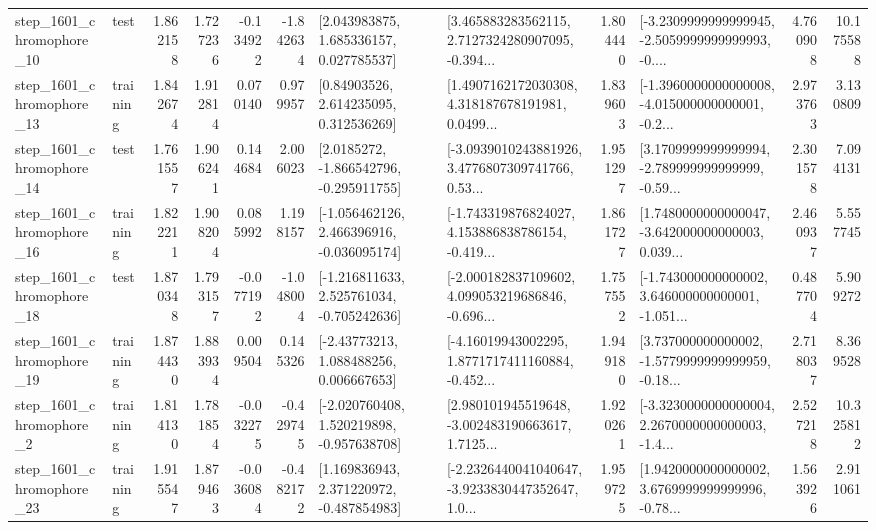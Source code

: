 \begin{tabular}{llrrrrllrlrr}
 step\_1601\_chromophore\_10 &      test &      1.862158 &    1.727236 &     -0.134922 & -1.842634 &     [2.043983875, 1.685336157, 0.027785537] &  [3.465883283562115, 2.7127324280907095, -0.394... &       1.804440 &  [-3.2309999999999945, -2.5059999999999993, -0.... &            4.760908 &         10.175588 \\
 step\_1601\_chromophore\_13 &  training &      1.842674 &    1.912814 &      0.070140 &  0.979957 &      [0.84903526, 2.614235095, 0.312536269] &  [1.4907162172030308, 4.318187678191981, 0.0499... &       1.839603 &  [-1.3960000000000008, -4.015000000000001, -0.2... &            2.973763 &          3.130809 \\
 step\_1601\_chromophore\_14 &      test &      1.761557 &    1.906241 &      0.144684 &  2.006023 &     [2.0185272, -1.866542796, -0.295911755] &  [-3.0939010243881926, 3.4776807309741766, 0.53... &       1.951297 &  [3.1709999999999994, -2.789999999999999, -0.59... &            2.301578 &          7.094131 \\
 step\_1601\_chromophore\_16 &  training &      1.822211 &    1.908204 &      0.085992 &  1.198157 &   [-1.056462126, 2.466396916, -0.036095174] &  [-1.743319876824027, 4.153886838786154, -0.419... &       1.861727 &  [1.7480000000000047, -3.642000000000003, 0.039... &            2.460937 &          5.557745 \\
 step\_1601\_chromophore\_18 &      test &      1.870348 &    1.793157 &     -0.077192 & -1.048004 &   [-1.216811633, 2.525761034, -0.705242636] &  [-2.000182837109602, 4.099053219686846, -0.696... &       1.757552 &  [-1.743000000000002, 3.646000000000001, -1.051... &            0.487704 &          5.909272 \\
 step\_1601\_chromophore\_19 &  training &      1.874430 &    1.883934 &      0.009504 &  0.145326 &     [-2.43773213, 1.088488256, 0.006667653] &  [-4.16019943002295, 1.8771717411160884, -0.452... &       1.949180 &  [3.737000000000002, -1.5779999999999959, -0.18... &            2.718037 &          8.369528 \\
  step\_1601\_chromophore\_2 &  training &      1.814130 &    1.781854 &     -0.032275 & -0.429745 &   [-2.020760408, 1.520219898, -0.957638708] &  [2.980101945519648, -3.002483190663617, 1.7125... &       1.920261 &  [-3.3230000000000004, 2.2670000000000003, -1.4... &            2.527218 &         10.325812 \\
 step\_1601\_chromophore\_23 &  training &      1.915547 &    1.879463 &     -0.036084 & -0.482172 &    [1.169836943, 2.371220972, -0.487854983] &  [-2.2326440041040647, -3.9233830447352647, 1.0... &       1.959725 &  [1.9420000000000002, 3.6769999999999996, -0.78... &            1.563926 &          2.911061 \\

\end{tabular}
